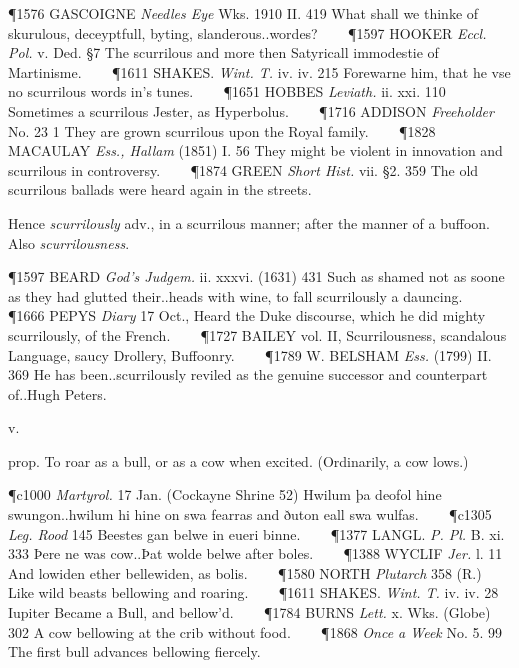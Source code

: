 \begin{description}[wide, labelwidth=!, labelindent=0pt]
\P 1576 GASCOIGNE  \textit{Needles Eye} Wks. 1910 II. 419  What shall we thinke of skurulous, deceyptfull, byting, slanderous..wordes?    
\P 1597 HOOKER  \textit{Eccl. Pol.} v. Ded. §7 The scurrilous and more then Satyricall immodestie of Martinisme.    
\P 1611 SHAKES.  \textit{Wint. T.} iv. iv. 215 Forewarne him, that he vse no scurrilous words in's tunes.    
\P 1651 HOBBES  \textit{Leviath.} ii. xxi. 110 Sometimes a scurrilous Jester, as Hyperbolus.    
\P 1716 ADDISON  \textit{Freeholder} No. 23 1 They are grown scurrilous upon the Royal family.    
\P 1828 MACAULAY  \textit{Ess., Hallam} (1851) I. 56 They might be violent in innovation and scurrilous in controversy.    
\P 1874 GREEN  \textit{Short Hist.} vii. §2. 359 The old scurrilous ballads were heard again in the streets.

\noindent Hence \textit{scurrilously} adv., in a scurrilous manner; after the manner of a buffoon. Also \textit{scurrilousness}.

\P 1597 BEARD  \textit{God's Judgem.} ii. xxxvi. (1631) 431 Such as shamed not as soone as they had glutted their..heads with wine, to fall scurrilously a dauncing.    
\P 1666 PEPYS  \textit{Diary} 17 Oct., Heard the Duke discourse, which he did mighty scurrilously, of the French.    
\P 1727 BAILEY  vol. II, Scurrilousness, scandalous Language, saucy Drollery, Buffoonry.    
\P 1789 W. BELSHAM  \textit{Ess.} (1799) II. 369 He has been..scurrilously reviled as the genuine successor and counterpart of..Hugh Peters.

 v.

\noindent {}

\vspace{-0.3cm}

\begin{myenumerate}

 prop. To roar as a bull, or as a cow when excited. (Ordinarily, a cow lows.)

\P c1000 \textit{Martyrol.}  17 Jan. (Cockayne Shrine 52) Hwilum þa deofol hine swungon..hwilum hi hine  on swa fearras and ðuton eall swa wulfas.    
\P c1305  \textit{Leg. Rood} 145 Beestes gan belwe in eueri binne.    
\P 1377 LANGL.  \textit{P. Pl.} B. xi. 333 Þere ne was cow..Þat wolde belwe after boles.    
\P 1388 WYCLIF  \textit{Jer.} l. 11 And lowiden ether bellewiden, as bolis.    
\P 1580 NORTH  \textit{Plutarch} 358 (R.) Like wild beasts bellowing and roaring.    
\P 1611 SHAKES.  \textit{Wint. T.} iv. iv. 28 Iupiter Became a Bull, and bellow'd.    
\P 1784 BURNS  \textit{Lett.} x. Wks. (Globe) 302 A cow bellowing at the crib without food.    
\P 1868 \textit{Once a Week} No. 5. 99 The first bull advances bellowing fiercely.


\end{myenumerate}
\end{description}
